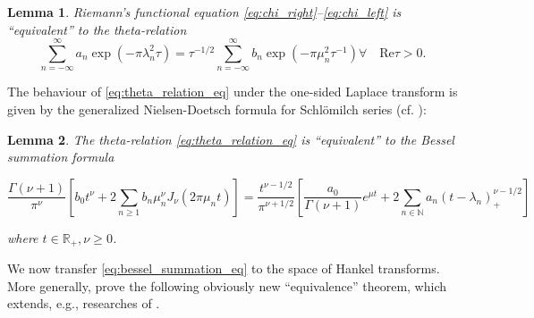 \documentclass{article}
\newtheorem{lemma}{Lemma}
{\theorembodyfont{\rmfamily}\newtheorem{remark}{Remark}}
\begin{document}
\begin{lemma}
  \label{lem:theta_relation}Riemann's functional equation
  \eqref{eq:chi_right}--\eqref{eq:chi_left} is ``equivalent'' to the
  theta-relation
  \begin{equation}
    \sum_{n = - \infty}^{\infty} a_n \exp (- \pi \lambda_n^2 \tau) = \tau^{- 1
    / 2}  \sum_{n = - \infty}^{\infty} b_n \exp (- \pi \mu_n^2 \tau^{- 1})
    \forall \quad \mathrm{Re} \tau > 0. \label{eq:theta_relation_eq}
  \end{equation}
\end{lemma}

The behaviour of \eqref{eq:theta_relation_eq} under the one-sided Laplace
transform is given by the generalized Nielsen-Doetsch formula for
Schl{\"o}milch series (cf. {\cite{11,15,16,23,24,31}}):

\begin{lemma}
  \label{lem:bessel_summation}The theta-relation \eqref{eq:theta_relation_eq}
  is ``equivalent'' to the Bessel summation formula
  
  \begin{equation}
    \frac{\Gamma (\nu + 1)}{\pi^{\nu}}  \left[ b_0 t^{\nu} + 2 \sum_{n \geq 1}
    b_n \mu_n^{\nu} J_{\nu} (2 \pi \mu_n t) \right] = \frac{t^{\nu - 1 /
    2}}{\pi^{\nu + 1 / 2}}  \left[ \frac{a_0}{\Gamma (\nu + 1)} e^{\mu t} + 2
    \sum_{n \in \mathbb{N}} a_n (t - \lambda_n)_+^{\nu - 1 / 2} \right]
    \label{eq:bessel_summation_eq}
  \end{equation}
  
  where $t \in \mathbb{R}_+, \nu \geq 0$.
\end{lemma}

We now transfer \eqref{eq:bessel_summation_eq} to the space of Hankel
transforms. More generally, prove the following obviously new ``equivalence''
theorem, which extends, e.g., researches of {\cite{11}}.
\end{document}
